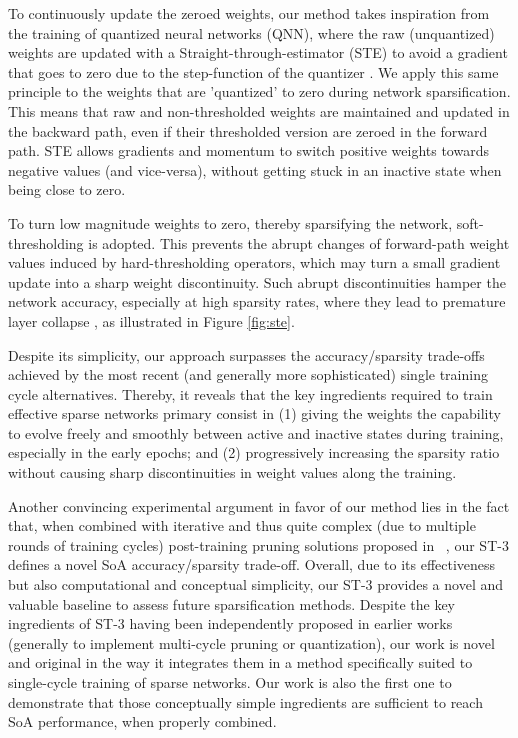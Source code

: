 \documentclass[10pt,twocolumn,letterpaper]{article}
\begin{document}
To continuously update the zeroed weights, our method takes inspiration from the training of quantized neural networks (QNN), where the raw (unquantized) weights are updated with a Straight-through-estimator (STE) to avoid a gradient that goes to zero due to the step-function of the quantizer \cite{Hubara2016,Li2016}. We apply this same principle to the weights that are 'quantized' to zero during network sparsification. This means that raw and non-thresholded weights are maintained and updated in the backward path, even if their thresholded version are zeroed in the forward path.
STE allows gradients and momentum to switch positive weights towards negative values (and vice-versa), without getting stuck in an inactive state when being close to zero.

To turn low magnitude weights to zero, thereby sparsifying the network, soft-thresholding is adopted. This prevents the abrupt changes of forward-path weight values induced by hard-thresholding operators, which may turn a small gradient update into a sharp weight discontinuity. Such abrupt discontinuities hamper the network accuracy, especially at high sparsity rates, where they lead to premature layer collapse \cite{Tanaka2020}, as illustrated in Figure \ref{fig:ste}.


Despite its simplicity, our approach surpasses the accuracy/sparsity trade-offs achieved by the most recent (and generally more sophisticated) single training cycle alternatives. Thereby, it reveals that the key ingredients required to train effective sparse networks primary consist in (1) giving the weights the capability to evolve freely and smoothly between active and inactive states during training, especially in the early epochs; 
and (2) progressively increasing the sparsity ratio without causing sharp discontinuities in weight values along the training.  

Another convincing experimental argument in favor of our method lies in the fact that, when combined with iterative and thus quite complex (due to multiple rounds of training cycles) post-training pruning solutions proposed in ~\cite{Frankle2020,Renda2020}, our ST-3 defines a novel SoA accuracy/sparsity trade-off. 
Overall, due to its effectiveness but also computational and conceptual simplicity, our ST-3 provides a novel and valuable baseline to assess future sparsification methods. Despite the key ingredients of ST-3 having been independently proposed in earlier works (generally to implement multi-cycle pruning or quantization), our work is novel and original in the way it integrates them in a method specifically suited to single-cycle training of sparse networks. Our work is also the first one to demonstrate that those conceptually simple ingredients are sufficient to reach SoA performance, when properly combined.
\end{document}
